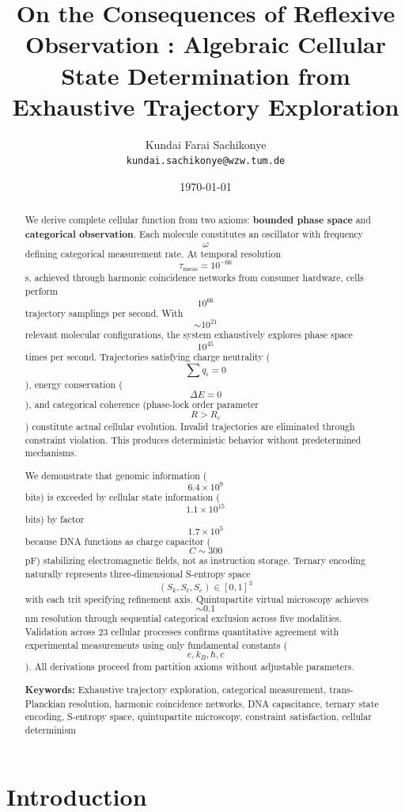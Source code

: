 \documentclass[11pt,twocolumn,a4paper]{article}
\title{\textbf{ On the Consequences of Reflexive Observation : Algebraic Cellular State Determination from Exhaustive Trajectory Exploration}}
\author{
    Kundai Farai Sachikonye\\
    \texttt{kundai.sachikonye@wzw.tum.de}
}
\date{\today}
\theoremstyle{remark}
\begin{document}
\maketitle

\begin{abstract}
We derive complete cellular function from two axioms: \textbf{bounded phase space} and \textbf{categorical observation}. Each molecule constitutes an oscillator with frequency $$\omega$$ defining categorical measurement rate. At temporal resolution $$\tau_{\mathrm{meas}} = 10^{-66}$$ s, achieved through harmonic coincidence networks from consumer hardware, cells perform $$10^{66}$$ trajectory samplings per second. With $$\sim 10^{21}$$ relevant molecular configurations, the system exhaustively explores phase space $$10^{45}$$ times per second. Trajectories satisfying charge neutrality ($$\sum q_i = 0$$), energy conservation ($$\Delta E = 0$$), and categorical coherence (phase-lock order parameter $$R > R_c$$) constitute actual cellular evolution. Invalid trajectories are eliminated through constraint violation. This produces deterministic behavior without predetermined mechanisms.

We demonstrate that genomic information ($$6.4 \times 10^9$$ bits) is exceeded by cellular state information ($$1.1 \times 10^{15}$$ bits) by factor $$1.7 \times 10^5$$ because DNA functions as charge capacitor ($$C \sim 300$$ pF) stabilizing electromagnetic fields, not as instruction storage. Ternary encoding naturally represents three-dimensional S-entropy space $$(S_k, S_t, S_e) \in [0,1]^3$$ with each trit specifying refinement axis. Quintupartite virtual microscopy achieves $$\sim 0.1$$ nm resolution through sequential categorical exclusion across five modalities. Validation across 23 cellular processes confirms quantitative agreement with experimental measurements using only fundamental constants ($$e, k_B, \hbar, c$$). All derivations proceed from partition axioms without adjustable parameters.

\vspace{0.5em}
\noindent\textbf{Keywords:} Exhaustive trajectory exploration, categorical measurement, trans-Planckian resolution, harmonic coincidence networks, DNA capacitance, ternary state encoding, S-entropy space, quintupartite microscopy, constraint satisfaction, cellular determinism
\end{abstract}


\section{Introduction}
\end{document}
